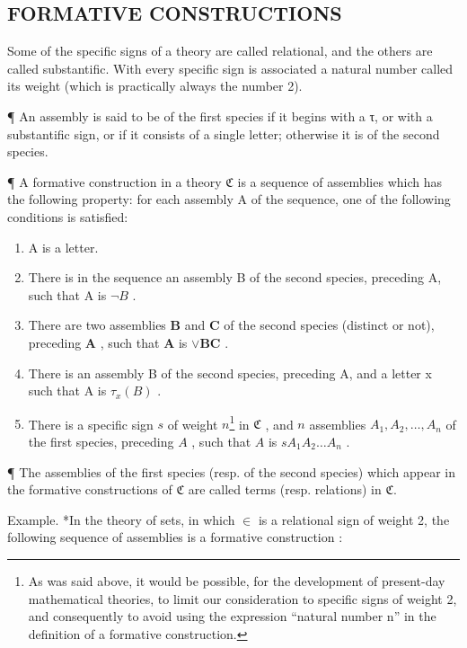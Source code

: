 \subsection{FORMATIVE CONSTRUCTIONS}

Some of the specific signs of a theory are called relational, and the others are called substantific. With every specific sign is associated a natural number called its weight (which is practically always the number 2).

¶ An assembly is said to be of the first species if it begins with a τ, or with a substantific sign, or if it consists of a single letter; otherwise it is of the second species.

¶ A formative construction in a theory \(\mathfrak{C}\) is a sequence of assemblies which has the following property: for each assembly A of the sequence, one of the following conditions is satisfied:

\begin{enumerate}
\def\labelenumi{(\alph{enumi})}
\item
  A is a letter.
\item
  There is in the sequence an assembly B of the second species, preceding A, such that A is \(\neg B\) .
\item
  There are two assemblies \(\pmb{B}\) and \(\pmb{C}\) of the second species (distinct or not), preceding \(\pmb{A}\) , such that \(\pmb{A}\) is \(\vee \pmb{BC}\) .
\item
  There is an assembly B of the second species, preceding A, and a letter x such that A is \(\tau_{x}(B)\) .
\item
  There is a specific sign \(s\) of weight \(n\)\footnote{As was said above, it would be possible, for the development of present-day mathematical theories, to limit our consideration to specific signs of weight 2, and consequently to avoid using the expression ``natural number n'' in the definition of a formative construction.} in \(\mathfrak{C}\) , and \(n\) assemblies \(A_{1}, A_{2}, \ldots, A_{n}\) of the first species, preceding \(A\) , such that \(A\) is \(sA_{1}A_{2} \ldots A_{n}\) .
\end{enumerate}

¶ The assemblies of the first species (resp. of the second species) which appear in the formative constructions of \(\mathfrak{C}\) are called terms (resp. relations) in \(\mathfrak{C}\).

Example. *In the theory of sets, in which \(\in\) is a relational sign of weight 2, the following sequence of assemblies is a formative construction :

